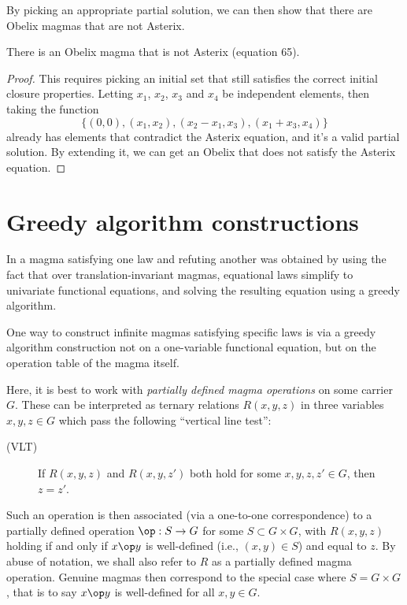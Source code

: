 By picking an appropriate partial solution, we can then show that there are Obelix magmas that are not Asterix.
\begin{corollary}
There is an Obelix magma that is not Asterix (equation 65).
\end{corollary}
\begin{proof}
This requires picking an initial set that still satisfies the correct initial closure properties. Letting
$x_1$, $x_2$, $x_3$ and $x_4$ be independent elements, then taking the function
$$\{(0,0), (x_1,x_2), (x_2-x_1, x_3), (x_1+x_3, x_4)\}$$
already has elements that contradict the Asterix equation, and it's a valid partial solution. By extending
it, we can get an Obelix that does not satisfy the Asterix equation.
\end{proof}

\section{Greedy algorithm constructions}\label{greedy-section}

In  a magma satisfying one law and refuting another was obtained by using the
fact that over translation-invariant magmas, equational laws simplify to univariate functional equations,
and solving the resulting equation using a greedy algorithm.

One way to construct infinite magmas satisfying specific laws is via a greedy algorithm construction not on a
one-variable functional equation, but on the operation table of the magma itself.

Here, it is best to work with \emph{partially defined magma operations} on some carrier $G$.  These can be interpreted as ternary relations $R(x,y,z)$ in three variables $x,y,z \in G$ which pass the following ``vertical line test'':

\begin{description}
  \item[(VLT)] If $R(x,y,z)$ and $R(x,y,z')$ both hold for some $x,y,z,z' \in G$, then $z=z'$.
\end{description}

Such an operation is then associated (via a one-to-one correspondence) to a partially defined operation $\op : S \to G$ for some $S \subset G \times G$, with $R(x,y,z)$ holding if and only if $x \op y$ is well-defined (i.e., $(x,y) \in S$) and equal to $z$.  By abuse of notation, we shall also refer to $R$ as a partially defined magma operation.  Genuine magmas then correspond to the special case where $S = G \times G$, that is to say $x \op y$ is well-defined for all $x,y \in G$.

